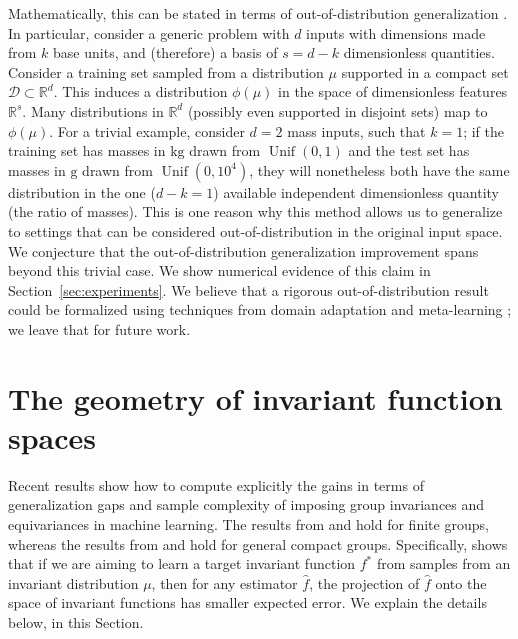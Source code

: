 \documentclass[twoside,11pt]{article}
\newcommand{\sectionname}{Section}
\newcommand{\secref}[1]{\sectionname~\ref{#1}}
\DeclareMathOperator{\Unif}{Unif}
\newcommand{\unit}[1]{\mathrm{#1}}
\newcommand{\kg}{\unit{kg}}
\newcommand{\g}{\unit{g}}
\begin{document}
Mathematically, this can be stated in terms of out-of-distribution generalization \citep{arjovsky2020out, geisa2021towards, dey2022out}. 
In particular, consider a generic problem with $d$ inputs with dimensions made from $k$ base units, and (therefore) a basis of $s=d-k$ dimensionless quantities. Consider a training set sampled from a distribution $\mu$ supported in a compact set $\mathcal D \subset \mathbb R^d$. This induces a distribution $\phi(\mu)$ in the space of dimensionless features $\mathbb R^s$.
Many distributions in $\mathbb R^d$ (possibly even supported in disjoint sets) map to $\phi(\mu)$.
For a trivial example, consider $d=2$ mass inputs, such that $k=1$; if the training set has masses in $\kg$ drawn from $\Unif(0,1)$ and the test set has masses in $\g$ drawn from $\Unif(0,10^4)$, they will nonetheless both have the same distribution in the one ($d-k=1$) available independent dimensionless quantity (the ratio of masses).
This is one reason why this method allows us to generalize to settings that can be considered out-of-distribution in the original input space.
We conjecture that the out-of-distribution generalization improvement spans beyond this trivial case.
We show numerical evidence of this claim in \secref{sec:experiments}.
We believe that a rigorous out-of-distribution result could be formalized using techniques from domain adaptation and meta-learning \citep{ben2010theory, mansour2009domain, hanneke2019value, li2018learning, kang2018transferable};
we leave that for future work.

\section{The geometry of invariant function spaces}\label{sec:analysis}

Recent results show how to compute explicitly the gains in terms of generalization gaps and sample complexity of imposing group invariances and equivariances in machine learning. The results from \citet{mei2021learning} and \citet{bietti2021sample} hold for finite groups, whereas the results from \citet{elesedy2021provably} and \citet{elesedy_kernel} hold for general compact groups.
Specifically, \citet{elesedy2021provably} shows that if we are aiming to learn a target invariant function $f^*$ from samples from an invariant distribution $\mu$, then for any estimator $\hat f$, the projection of $\hat f$ onto the space of invariant functions has smaller expected error. We explain the details below, in this \sectionname.
\end{document}
